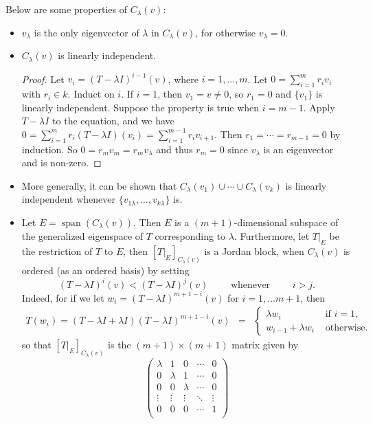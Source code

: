 \documentclass[12pt]{article}
\begin{document}
Below are some properties of $C_{\lambda}(v)$:
\begin{itemize}
\item 
$v_{\lambda}$ is the only eigenvector of $\lambda$ in $C_{\lambda}(v)$, for otherwise $v_{\lambda}=0$.
\item 
$C_{\lambda}(v)$ is linearly independent.
\begin{proof}  Let $v_i=(T-\lambda I)^{i-1}(v)$, where $i=1,\ldots,m$.  Let $0=\sum_{i=1}^m r_iv_i$ with $r_i\in k$.  Induct on $i$.  If $i=1$, then $v_1=v\ne 0$, so $r_1=0$ and $\lbrace v_1\rbrace$ is linearly independent.  Suppose the property is true when $i=m-1$.  Apply $T-\lambda I$ to the equation, and we have $0=\sum_{i=1}^m r_i(T-\lambda I)(v_i)= \sum_{i=1}^{m-1}r_iv_{i+1}$.  Then $r_1=\cdots=r_{m-1}=0$ by induction.  So $0=r_mv_m=r_mv_{\lambda}$ and thus $r_m=0$ since $v_{\lambda}$ is an eigenvector and is non-zero.
\end{proof}
\item
More generally, it can be shown that $C_{\lambda}(v_1)\cup \cdots \cup C_{\lambda}(v_k)$ is linearly independent whenever  $\lbrace v_{1\lambda},\ldots,v_{k\lambda}\rbrace$ is.
\item
Let $E=\operatorname{span}(C_{\lambda}(v))$.  Then $E$ is a $(m+1)$-dimensional subspace of the generalized eigenspace of $T$ corresponding to $\lambda$.  Furthermore, let $T|_E$ be the restriction of $T$ to $E$, then $[T|_E]_{C_{\lambda}(v)}$ is a Jordan block, when $C_{\lambda}(v)$ is ordered (as an ordered basis) by setting $$(T-\lambda I)^i(v)<(T-\lambda I)^j(v)\qquad\mbox{ whenever }\qquad i>j.$$  Indeed, for if we let $w_i=(T-\lambda I)^{m+1-i}(v)$ for $i=1,\ldots m+1$, then
\begin{eqnarray*}
T(w_i)=(T-\lambda I + \lambda I)(T-\lambda I)^{m+1-i}(v) &=& \left\{
\begin{array}{ll}
\lambda w_i & \mbox{ if } i=1, \\
w_{i-1}+\lambda w_i & \mbox{ otherwise.}
\end{array}\right.
\end{eqnarray*}
so that $[T|_E]_{C_{\lambda}(v)}$ is the $(m+1)\times (m+1)$ matrix given by
$$\begin{pmatrix}
\lambda & 1 & 0 & \cdots & 0\\
0 & \lambda & 1 & \cdots & 0\\
0 & 0 & \lambda & \cdots & 0\\
\vdots & \vdots & \vdots & \ddots & \vdots\\
0 & 0 & 0 & \cdots & 1\\

\end{pmatrix}$$
\end{itemize}
\end{document}
